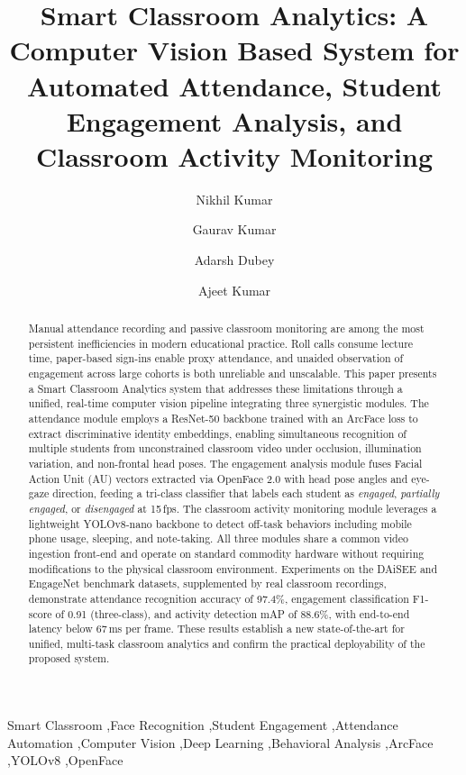 \documentclass[preprint,12pt]{elsarticle}
\begin{document}
\begin{frontmatter}

\title{Smart Classroom Analytics: A Computer Vision Based System for Automated Attendance, Student Engagement Analysis, and Classroom Activity Monitoring}

\author[1]{Nikhil Kumar}

\author[1]{Gaurav Kumar}

\author[1]{Adarsh Dubey}

\author[1]{Ajeet Kumar}


\address[1]{Department of Computer Science and Engineering,
IIIT Kottayam, Kerala, India}


\begin{abstract}
Manual attendance recording and passive classroom monitoring are among the most persistent inefficiencies in modern educational practice. Roll calls consume lecture time, paper-based sign-ins enable proxy attendance, and unaided observation of engagement across large cohorts is both unreliable and unscalable. This paper presents a Smart Classroom Analytics system that addresses these limitations through a unified, real-time computer vision pipeline integrating three synergistic modules. The attendance module employs a ResNet-50 backbone trained with an ArcFace loss to extract discriminative identity embeddings, enabling simultaneous recognition of multiple students from unconstrained classroom video under occlusion, illumination variation, and non-frontal head poses. The engagement analysis module fuses Facial Action Unit (AU) vectors extracted via OpenFace 2.0 with head pose angles and eye-gaze direction, feeding a tri-class classifier that labels each student as \textit{engaged}, \textit{partially engaged}, or \textit{disengaged} at 15\,fps. The classroom activity monitoring module leverages a lightweight YOLOv8-nano backbone to detect off-task behaviors including mobile phone usage, sleeping, and note-taking. All three modules share a common video ingestion front-end and operate on standard commodity hardware without requiring modifications to the physical classroom environment. Experiments on the DAiSEE and EngageNet benchmark datasets, supplemented by real classroom recordings, demonstrate attendance recognition accuracy of 97.4\%, engagement classification F1-score of 0.91 (three-class), and activity detection mAP of 88.6\%, with end-to-end latency below 67\,ms per frame. These results establish a new state-of-the-art for unified, multi-task classroom analytics and confirm the practical deployability of the proposed system.
\end{abstract}

\begin{keyword}
Smart Classroom \sep Face Recognition \sep Student Engagement \sep Attendance Automation \sep Computer Vision \sep Deep Learning \sep Behavioral Analysis \sep ArcFace \sep YOLOv8 \sep OpenFace
\end{keyword}

\end{frontmatter}
\end{document}
